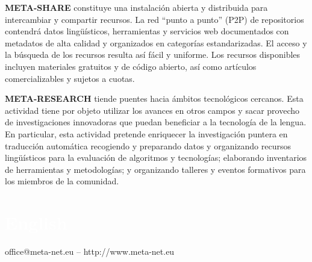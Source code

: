 \begin{multicols}{2}
\textbf{META-SHARE} constituye una instalación abierta y distribuida para intercambiar y compartir recursos. La red “punto a punto” (P2P) de repositorios contendrá datos lingüísticos, herramientas y servicios web documentados con metadatos de alta calidad y organizados en categorías estandarizadas. El acceso y la búsqueda de los recursos resulta así fácil y uniforme. Los recursos disponibles incluyen materiales gratuitos y de código abierto, así como artículos comercializables y sujetos a cuotas. 

\textbf{META-RESEARCH} tiende puentes hacia ámbitos tecnológicos cercanos. Esta actividad tiene por objeto utilizar los avances en otros campos y sacar provecho de investigaciones innovadoras que puedan beneficiar a la tecnología de la lengua. En particular, esta actividad pretende enriquecer la investigación puntera en traducción automática recogiendo y preparando datos y organizando recursos lingüísticos para la evaluación de algoritmos y tecnologías; elaborando inventarios de herramientas y metodologías; y organizando talleres y eventos formativos para los miembros de la comunidad.

\end{multicols}

\vfill

\makeatletter
{}
{
  \renewcommand*{\theHsection}{\thepart.\thesection}
}
\makeatother
\part*{\textcolor{white}{English}}
\setcounter{section}{0}
\setcounter{figure}{0}

\centerline{office@meta-net.eu -- http://www.meta-net.eu}


\cleardoublepage



